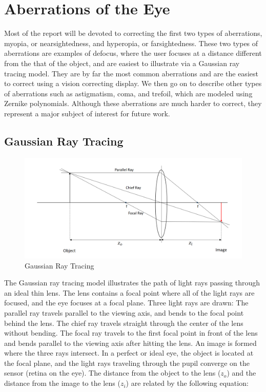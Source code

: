 \chapter{Aberrations of the Eye}

Most of the report will be devoted to correcting the first two types of aberrations, myopia, or nearsightedness, and hyperopia, or farsightedness. These two types of aberrations are examples of defocus, where the user focuses at a distance different from the that of the object, and are easiest to illustrate via a Gaussian ray tracing model. They are by far the most common aberrations and are the easiest to correct using a vision correcting display. We then go on to describe other types of aberrations such as astigmatism, coma, and trefoil, which are modeled using Zernike polynomials. Although these aberrations are much harder to correct, they represent a major subject of interest for future work.

\section{Gaussian Ray Tracing}

\begin{figure}[h!]
  \centering
  \includegraphics[width=5.0in]{chapters/chapter2/images/gauss.png}
  \caption{Gaussian Ray Tracing}
  \label{fig:gaussian}
\end{figure}

The Gaussian ray tracing model illustrates the path of light rays passing through an ideal thin lens. The lens contains a focal point where all of the light rays are focused, and the eye focuses at a focal plane. Three light rays are drawn: The parallel ray travels parallel to the viewing axis, and bends to the focal point behind the lens. The chief ray travels straight through the center of the lens without bending. The focal ray travels to the first focal point in front of the lens and bends parallel to the viewing axis after hitting the lens. An image is formed where the three rays intersect. In a perfect or ideal eye, the object is located at the focal plane, and the light rays traveling through the pupil converge on the sensor (retina on the eye).  The distance from the object to the lens ($z_o$) and the distance from the image to the lens ($z_i$) are related by the following equation: 

